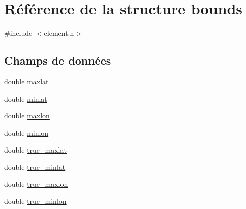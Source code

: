 \hypertarget{structbounds}{\section{Référence de la structure bounds}
\label{structbounds}
}


{\ttfamily \#include $<$element.\-h$>$}

\subsection*{Champs de données}
\begin{DoxyCompactItemize}
\item 
double \hyperlink{structbounds_ae9226bfc6c0b8e70b9e173bd0bf97a01_ae9226bfc6c0b8e70b9e173bd0bf97a01}{maxlat}
\item 
double \hyperlink{structbounds_a1289c4fe27cf61bfb7bab8c4ce5c52c4_a1289c4fe27cf61bfb7bab8c4ce5c52c4}{minlat}
\item 
double \hyperlink{structbounds_a57509dd447c447b76053b6f88890a296_a57509dd447c447b76053b6f88890a296}{maxlon}
\item 
double \hyperlink{structbounds_af2a3f118f307135a85f8dcd3bef7a8f7_af2a3f118f307135a85f8dcd3bef7a8f7}{minlon}
\item 
double \hyperlink{structbounds_a5604c8dc397ea56291b39fc65c4ebc2d_a5604c8dc397ea56291b39fc65c4ebc2d}{true\-\_\-maxlat}
\item 
double \hyperlink{structbounds_a889929f6ac1255785d92a87ad1299abf_a889929f6ac1255785d92a87ad1299abf}{true\-\_\-minlat}
\item 
double \hyperlink{structbounds_aeab2523eb1b2a75d74baab3996e7be6d_aeab2523eb1b2a75d74baab3996e7be6d}{true\-\_\-maxlon}
\item 
double \hyperlink{structbounds_aea9e0c50d8167322a532b006a41b88b7_aea9e0c50d8167322a532b006a41b88b7}{true\-\_\-minlon}
\end{DoxyCompactItemize}


